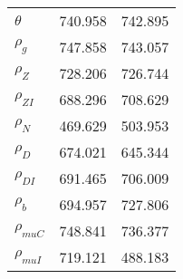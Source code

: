 \begin{center}
\begin{longtable}{lcc}
$ {\theta}             $	 & 	     740.958	 & 	     742.895 \\ 
$ {\rho_g}             $	 & 	     747.858	 & 	     743.057 \\ 
$ {\rho_Z}             $	 & 	     728.206	 & 	     726.744 \\ 
$ {\rho_{ZI}}          $	 & 	     688.296	 & 	     708.629 \\ 
$ {\rho_N}             $	 & 	     469.629	 & 	     503.953 \\ 
$ {\rho_D}             $	 & 	     674.021	 & 	     645.344 \\ 
$ {\rho_{DI}}          $	 & 	     691.465	 & 	     706.009 \\ 
$ {\rho_b}             $	 & 	     694.957	 & 	     727.806 \\ 
$ {\rho_{muC}}         $	 & 	     748.841	 & 	     736.377 \\ 
$ {\rho_{muI}}         $	 & 	     719.121	 & 	     488.183 \\ 
\end{longtable}
 \end{center}
